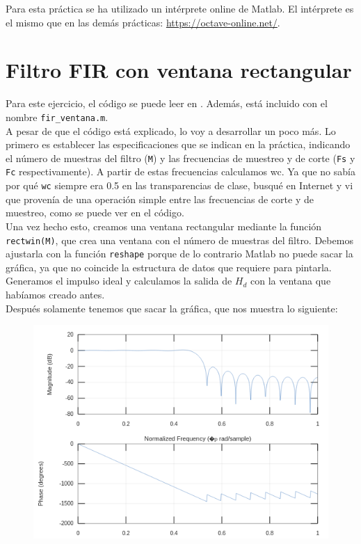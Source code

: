 \documentclass[11pt,a4paper]{article}
\begin{document}
\tableofcontents
\thispagestyle{empty}

\newpage

Para esta práctica se ha utilizado un intérprete online de Matlab. El intérprete es el mismo que en las demás prácticas: \color{blue} \url{https://octave-online.net/}\color{black}.

\section{Filtro FIR con ventana rectangular}
 Para este ejercicio, el código se puede leer en \color{deepred}\color{black}. Además, está incluido con el nombre \texttt{fir\_ventana.m}.\\
 
A pesar de que el código está explicado, lo voy a desarrollar un poco más. Lo primero es establecer las especificaciones que se indican en la práctica, indicando el número de muestras del filtro (\texttt{M}) y las frecuencias de muestreo y de corte (\texttt{Fs} y \texttt{Fc} respectivamente). A partir de estas frecuencias calculamos wc. Ya que no sabía por qué \texttt{wc} siempre era 0.5 en las transparencias de clase, busqué en Internet y vi que provenía de una operación simple entre las frecuencias de corte y de muestreo, como se puede ver en el código.\\

Una vez hecho esto, creamos una ventana rectangular mediante la función \texttt{rectwin(M)}, que crea una ventana con el número de muestras del filtro. Debemos ajustarla con la función \texttt{reshape} porque de lo contrario Matlab no puede sacar la gráfica, ya que no coincide la estructura de datos que requiere para pintarla.\\

Generamos el impulso ideal y calculamos la salida de $H_d$ con la ventana que habíamos creado antes.\\

Después solamente tenemos que sacar la gráfica, que nos muestra lo siguiente:

\begin{figure}[H]
	\centering
	\includegraphics[scale=0.5]{img/1.png}
\end{figure}
 
\end{document}
